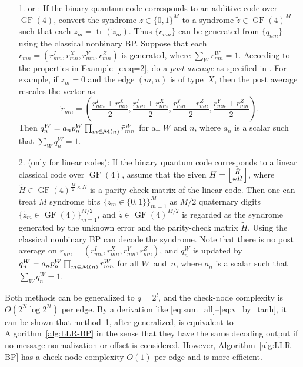 \documentclass{ieeeaccess}
\DeclareMathOperator{\GF}{GF}
\DeclareMathOperator{\tr}{tr}
\newcommand{\sM}{{\cal M}}
\let\emph\textit
\theoremstyle{definition}		%
\begin{document}
\begin{itemize}%
\item[1.] \cite[(13)--(16)]{Wan+12} or \cite[(31)--(34)]{Bab+15}: 
	If the binary quantum code corresponds to an additive code over $\GF(4)$,  {convert the syndrome $z\in\{0,1\}^M$ to a syndrome $\tilde z\in\GF(4)^M$} such that each $z_m=\tr(\tilde{z}_m)$. %
	Thus $\{r_{mn}\}$ can be generated from $\{q_{nm}\}$ using the classical nonbinary BP. 
	Suppose that each ${ r_{mn}=(r_{mn}^{I}, r_{mn}^{X}, r_{mn}^{Y}, r_{mn}^{Z}) }$ is generated, where ${ \sum_W r_{mn}^W = 1 }$.
	According to the properties in Example~\ref{ex:q=2}, do a \emph{post average} as specified in \cite{Wan+12,Bab+15}. 
	For example, if $z_m=0$ and the edge $(m,n)$ is of type~$X$, then the post average rescales the vector as 
	$$\textstyle \tilde r_{mn}=(\frac{r_{mn}^{I}+r_{mn}^{X}}{2}, \frac{r_{mn}^{I}+r_{mn}^{X}}{2}, \frac{r_{mn}^{Y}+r_{mn}^{Z}}{2}, \frac{r_{mn}^{Y}+r_{mn}^{Z}}{2}).$$
	Then $q_n^W = a_n p_n^W \prod_{m\in\sM(n)} \tilde r_{mn}^W$ for all $W$ and $n$, where $a_n$ is a scalar such that $\sum_W q_n^W=1$.
%
\item[2.] \cite[(44)--(47)]{Bab+15} (only for linear codes): 
	If the binary quantum code corresponds to a linear classical code over $\GF(4)$, %
	assume that the given ${ H=\left[ \tilde H \atop \omega \tilde H \right] }$, 
	where ${ \tilde H \in \GF(4)^{\frac{M}{2}\times N} }$ is a parity-check matrix of the linear code.  
	Then one can treat $M$ syndrome bits ${ \{z_m\in\{0,1\}\}_{m=1}^M }$ as $M/2$ quaternary digits ${ \{\tilde z_m\in\GF(4)\}_{m=1}^{M/2} }$,
	and $\tilde z\in\GF(4)^{M/2}$ is regarded as the syndrome generated by the unknown error and the parity-check matrix $\tilde H$. %
	Using the classical nonbinary BP can decode the syndrome. Note that there is no post average on $r_{mn}=(r_{mn}^{I}, r_{mn}^{X}, r_{mn}^{Y}, r_{mn}^{Z})$, 
	and $q_n^W$ is updated by $q_n^W = a_n p_n^W \prod_{m\in\sM(n)} r_{mn}^W$ for all $W$~and~$n$, where $a_n$ is a scalar such that $\sum_W q_n^W=1$.
\end{itemize}


Both methods can be generalized to ${q=2^l}$, and the check-node complexity is ${O(2^{2l}\log 2^{2l})}$ per edge. 
%
By a derivation like \eqref{eq:sum_all}--\eqref{eq:v_by_tanh}, it can be shown that method~1, after generalized, is equivalent to Algorithm~\ref{alg:LLR-BP} in the sense that they have the same decoding output if no message normalization or offset is considered. 
However, Algorithm~\ref{alg:LLR-BP} has a check-node complexity $O(1)$ per edge and is more efficient.
\end{document}

